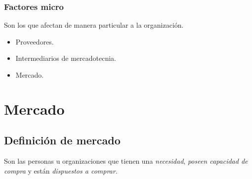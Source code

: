 \documentclass[spanish, twocolumn, twoside,openany]{book}
\begin{document}
\subsection{Factores micro}

Son los que afectan de manera particular a la organización.

\begin{itemize}
	\item Proveedores.
	\item Intermediarios de mercadotecnia.
	\item Mercado.
\end{itemize}


\chapter{Mercado}


\section{Definición de mercado}
Son las personas u organizaciones que tienen una \emph{necesidad}, \emph{poseen capacidad de compra} y están \emph{dispuestos a comprar}.
\end{document}
